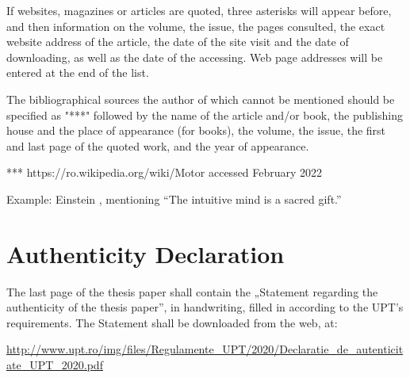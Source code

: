 If websites, magazines or articles are quoted, three asterisks will appear before, and then information on the volume, the issue, the pages consulted, the exact website address of the article, the date of the site visit and the date of downloading, as well as the date of the accessing. Web page addresses will be entered at the end of the list.

The bibliographical sources the author of which cannot be mentioned should be specified as "***" followed by the name of the article and/or book, the publishing house and the place of appearance (for books), the volume, the issue, the first and last page of the quoted work, and the year of appearance. 

*** https://ro.wikipedia.org/wiki/Motor accessed February 2022

Example: \label{example:citation} Einstein \cite{einstein}, mentioning \enquote{The intuitive mind is a sacred gift.}

\section{Authenticity Declaration}
The last page of the thesis paper shall contain the „Statement regarding the authenticity of the thesis paper”, in handwriting, filled in according to the UPT’s requirements. The Statement shall be downloaded from the web, at:

\url{http://www.upt.ro/img/files/Regulamente_UPT/2020/Declaratie_de_autenticitate_UPT_2020.pdf}